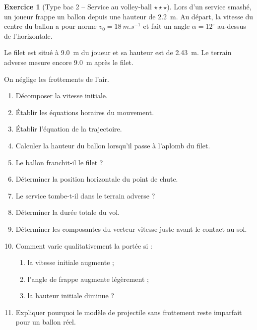 \documentclass[11pt,a4paper]{article}
\theoremstyle{definition}
\newtheorem{exercice}{Exercice}[section]
\newcommand{\etoiles}[1]{\hfill{\small\textbf{#1}}}
\begin{document}
\begin{exercice}[Type bac 2 -- Service au volley-ball \etoiles{$\star\star\star$}]
Lors d’un service smashé, un joueur frappe un ballon depuis une hauteur de \SI{2,2}{m}.
Au départ, la vitesse du centre du ballon a pour norme $v_0=\SI{18}{m.s^{-1}}$ et fait un angle
$\alpha=12^\circ$ au-dessus de l’horizontale.

Le filet est situé à \SI{9,0}{m} du joueur et sa hauteur est de \SI{2,43}{m}.
Le terrain adverse mesure encore \SI{9,0}{m} après le filet.

On néglige les frottements de l’air.

\begin{enumerate}[label=\arabic*.]
    \item Décomposer la vitesse initiale.
    \item Établir les équations horaires du mouvement.
    \item Établir l’équation de la trajectoire.
    \item Calculer la hauteur du ballon lorsqu’il passe à l’aplomb du filet.
    \item Le ballon franchit-il le filet ?
    \item Déterminer la position horizontale du point de chute.
    \item Le service tombe-t-il dans le terrain adverse ?
    \item Déterminer la durée totale du vol.
    \item Déterminer les composantes du vecteur vitesse juste avant le contact au sol.
    \item Comment varie qualitativement la portée si :
    \begin{enumerate}[label=\alph*)]
        \item la vitesse initiale augmente ;
        \item l’angle de frappe augmente légèrement ;
        \item la hauteur initiale diminue ?
    \end{enumerate}
    \item Expliquer pourquoi le modèle de projectile sans frottement reste imparfait pour un ballon réel.
\end{enumerate}
\end{exercice}
\end{document}
